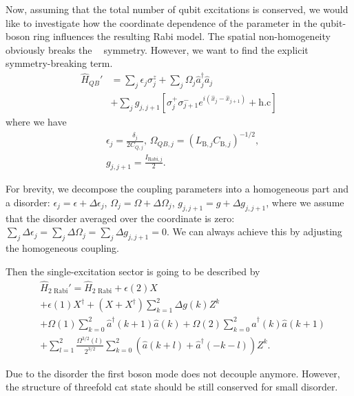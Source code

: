 \documentclass[reprint, aps, prx, amsmath, amssymb, longbibliography, superscriptaddress]{revtex4-2}
\DeclareMathOperator{\Zthree}{\mathbb{Z}_3}
\begin{document}
Now, assuming that the total number of qubit excitations is conserved, we would like to investigate how the coordinate dependence of the parameter in the qubit-boson ring influences the resulting Rabi model. The spatial non-homogeneity obviously breaks the $\Zthree$ symmetry. However, we want to find the explicit symmetry-breaking term.
\begin{equation}
\label{rabi-breaking-disorder}
\begin{aligned}
  \hat H_{QB}' &= \sum_j \epsilon_{j} \sigma_j^z + \sum_j \Omega_j \hat a^{\dagger}_j \hat a_j  \\
  &+ \sum_j g_{j,j+1} \left[\sigma_j^+ \sigma_{j+1}^- e^{i (\hat x_j - \hat x_{j+1})} +\text{h.c}\right]
\end{aligned}
\end{equation}
where we have
\begin{equation}
\begin{aligned}
    &\epsilon_j = \frac{\delta_j}{2 C_{Q,j}},\,
    \Omega_{QB,j} = \left(L_{\text{B},j}C_{\text{B},j}\right)^{-1/2}, \\
    &g_{j,j+1} = \frac{I_{\text{Rabi},j}}{2}.
\end{aligned}
\end{equation}

For brevity, we decompose the coupling parameters into a homogeneous part and a disorder: $\epsilon_j = \epsilon + \Delta \epsilon_j$, $\Omega_j = \Omega + \Delta \Omega_j$, $g_{j,j+1} = g + \Delta g_{j,j+1}$, where we assume that the disorder averaged over the coordinate is zero: $\sum_j \Delta \epsilon_j =  \sum_j \Delta \Omega_j = \sum_j \Delta g_{j,j+1} =0$. We can always achieve this by adjusting the homogeneous coupling.

Then the single-excitation sector is going to be described by
\begin{equation}
\begin{aligned}
    &\hat H_{\text{2 Rabi}}' = \hat H_{\text{2 Rabi}} + \epsilon(2) X \\
    &+\epsilon(1)  X^{\dagger} + (X + X^{\dagger}) \sum\limits_{k=1}^2 \Delta g(k) Z^k\\
    &+ \Omega(1) \sum\limits_{k=0}^2 \hat a^{\dagger}(k+1) \hat a(k) + \Omega(2) \sum\limits_{k=0}^2 \hat a^{\dagger}(k) \hat a(k+1) \\
    &+ \sum\limits_{l=1}^2 \frac{\Omega^{3/2}(l)}{2^{3/2}} \sum\limits_{k=0}^2 (\hat a(k+l) + \hat a^{\dagger}(-k-l)) Z^k.
\end{aligned}
\end{equation}

Due to the disorder the first boson mode does not decouple anymore. However, the structure of threefold cat state should be still conserved for small disorder. 




\end{document}
